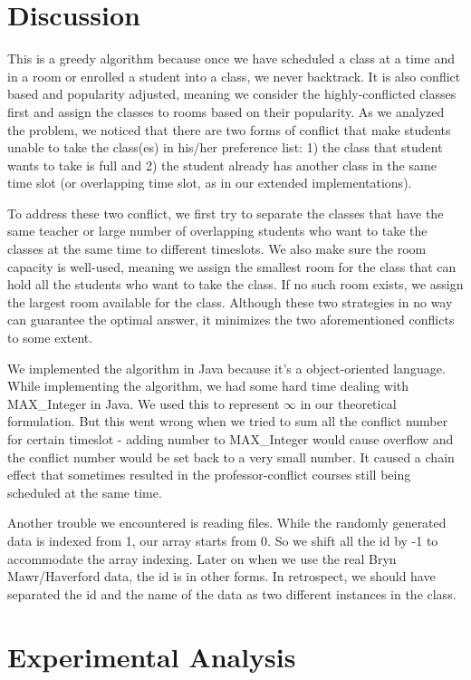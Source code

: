 \documentclass[11pt, oneside]{article}   	%
\begin{document}
\section{Discussion}

This is a greedy algorithm because once we have scheduled a class at a time and in a room or enrolled a student into a class, we never backtrack. It is also conflict based and popularity adjusted, meaning we consider the highly-conflicted classes first and assign the classes to rooms based on their popularity. As we analyzed the problem, we noticed that there are two forms of conflict that make students unable to take the class(es) in his/her preference list: 1) the class that student wants to take is full and 2) the student already has another class in the same time slot (or overlapping time slot, as in our extended implementations). 

To address these two conflict, we first try to separate the classes that have the same teacher or large number of overlapping students who want to take the classes at the same time to different timeslots. We also make sure the room capacity is well-used, meaning we assign the smallest room for the class that can hold all the students who want to take the class. If no such room exists, we assign the largest room available for the class. Although these two strategies in no way can guarantee the optimal answer, it minimizes the two aforementioned conflicts to some extent. 

We implemented the algorithm in Java because it's a object-oriented language. While implementing the algorithm, we had some hard time dealing with MAX\_Integer in Java. We used this to represent $\infty$ in our theoretical formulation. But this went wrong when we tried to sum all the conflict number for certain timeslot - adding number to MAX\_Integer would cause overflow and the conflict number would be set back to a very small number. It caused a chain effect that sometimes resulted in the professor-conflict courses still being scheduled at the same time.

Another trouble we encountered is reading files. While the randomly generated data is indexed from 1, our array starts from 0. So we shift all the id by -1 to accommodate the array indexing. Later on when we use the real Bryn Mawr/Haverford data, the id is in other forms. In retrospect, we should have separated the id and the name of the data as two different instances in the class. 

\section{Experimental Analysis}
\end{document}
